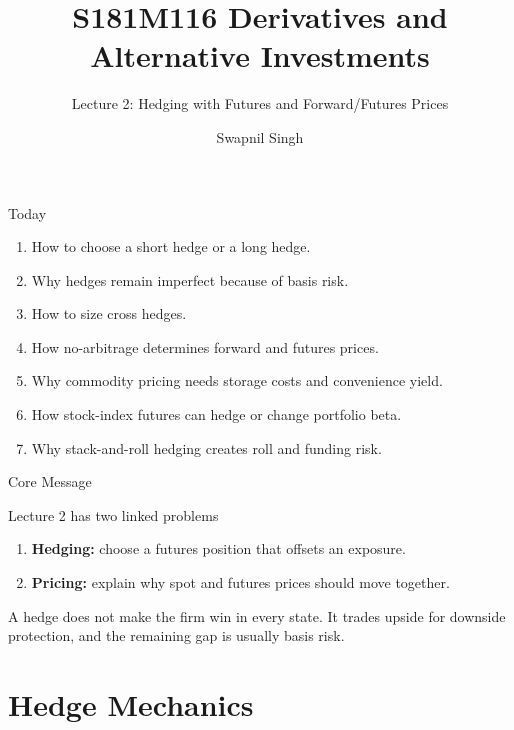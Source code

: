 \documentclass[aspectratio=169,11pt]{beamer}
\title{S181M116 Derivatives and Alternative Investments}
\subtitle{Lecture 2: Hedging with Futures and Forward/Futures Prices}
\author{Swapnil Singh}
\institute{Lietuvos Bankas and Kaunas University of Technology}
\date{}
\begin{document}
\begin{frame}
    \titlepage
\end{frame}

\begin{frame}{Today}
    \begin{enumerate}
        \item How to choose a short hedge or a long hedge.
        \item Why hedges remain imperfect because of basis risk.
        \item How to size cross hedges.
        \item How no-arbitrage determines forward and futures prices.
        \item Why commodity pricing needs storage costs and convenience yield.
        \item How stock-index futures can hedge or change portfolio beta.
        \item Why stack-and-roll hedging creates roll and funding risk.
    \end{enumerate}
\end{frame}

\begin{frame}{Core Message}
    \begin{block}{Lecture 2 has two linked problems}
        \begin{enumerate}
            \item \textbf{Hedging:} choose a futures position that offsets an exposure.
            \item \textbf{Pricing:} explain why spot and futures prices should move together.
        \end{enumerate}
    \end{block}

    \vspace{0.5em}
    A hedge does not make the firm win in every state.
    It trades upside for downside protection, and the remaining gap is usually basis risk.
\end{frame}

\section{Hedge Mechanics}
\end{document}
